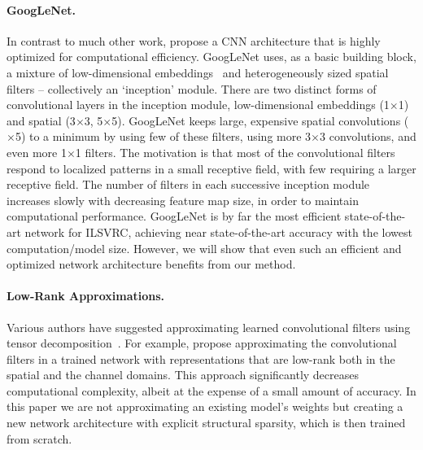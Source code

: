 \documentclass[thesis]{subfiles}
\begin{document}
	\paragraph{GoogLeNet.} In contrast to much other work, \citet{Szegedy2014going} propose a CNN architecture that is highly optimized for computational efficiency. GoogLeNet uses, as a basic building block, a mixture of low-dimensional embeddings~\citep{Lin2013NiN} and heterogeneously sized spatial filters -- collectively an `inception' module. 
	There are two distinct forms of convolutional layers in the inception module, low-dimensional embeddings (1$\times$1) and spatial (3$\times$3, 5$\times $5). GoogLeNet keeps large, expensive spatial convolutions ($\times$5) to a minimum by using few of these filters, using more 3$\times$3 convolutions, and even more 1$\times$1 filters. The motivation is that most of the convolutional filters respond to localized patterns in a small receptive field, with few requiring a larger receptive field. The number of filters in each successive inception module increases slowly with decreasing feature map size, in order to maintain computational performance. GoogLeNet is by far the most efficient state-of-the-art network for ILSVRC, achieving near state-of-the-art accuracy with the lowest computation/model size. However, we will show that even such an efficient and optimized network architecture benefits from our method.
	
	\paragraph{Low-Rank Approximations.}
	Various authors have suggested approximating learned convolutional filters using tensor decomposition~\citep{journals/corr/JaderbergVZ14,journals/corr/LebedevGROL14,Kim2016}. For example, \citet{journals/corr/JaderbergVZ14} propose approximating the convolutional filters in a trained network with representations that are low-rank both in the spatial and the channel domains. This approach significantly decreases computational complexity, albeit at the expense of a small amount of accuracy. In this paper we are not approximating an existing model's weights but creating a new network architecture with explicit structural sparsity, which is then trained from scratch.
	
\end{document}
